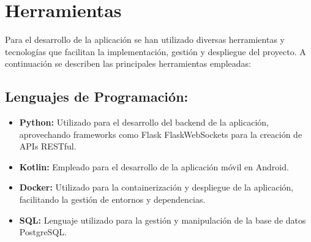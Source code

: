 \section{Herramientas}
Para el desarrollo de la aplicación se han utilizado diversas herramientas y tecnologías que facilitan la 
implementación, gestión y despliegue del proyecto. A continuación se describen las principales herramientas 
empleadas:
\subsection{Lenguajes de Programación:}
\begin{itemize}
    \item \textbf{Python:} Utilizado para el desarrollo del backend de la aplicación, aprovechando frameworks como 
    Flask FlaskWebSockets para la creación de APIs RESTful.
    \item \textbf{Kotlin:} Empleado para el desarrollo de la aplicación móvil en Android.
    \item \textbf{Docker:} Utilizado para la containerización y despliegue de la aplicación, 
    facilitando la gestión de entornos y dependencias.
    \item \textbf{SQL:} Lenguaje utilizado para la gestión y manipulación de la base de datos PostgreSQL.
\end{itemize}
